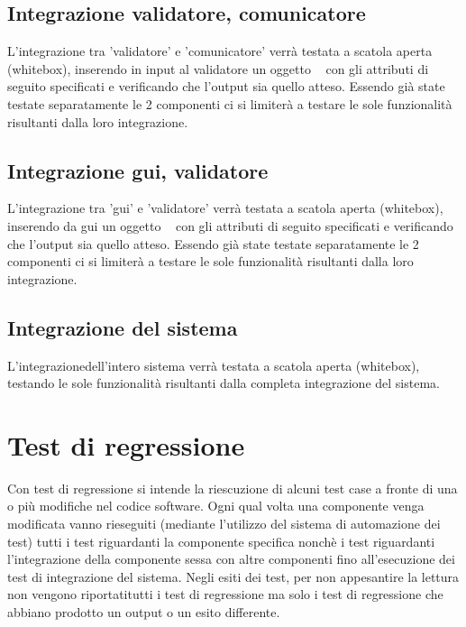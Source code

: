 \subsection{Integrazione validatore, comunicatore}
L'integrazione tra 'validatore' e 'comunicatore' verr\`a testata a scatola aperta (whitebox), inserendo in input al validatore un oggetto \textit{\br\ } con gli attributi di seguito specificati e verificando che l'output sia quello atteso. Essendo gi\`a state testate separatamente le 2 componenti ci si limiter\`a a testare le sole funzionalit\`a risultanti dalla loro integrazione.\\

\subsection{Integrazione gui, validatore}
L'integrazione tra 'gui' e 'validatore' verr\`a testata a scatola aperta (whitebox), inserendo da gui  un oggetto \textit{\br\ } con gli attributi di seguito specificati e verificando che l'output sia quello atteso. Essendo gi\`a state testate separatamente le 2 componenti ci si limiter\`a a testare le sole funzionalit\`a risultanti dalla loro integrazione.\\

\subsection{Integrazione del sistema}
L'integrazionedell'intero sistema verr\`a testata a scatola aperta (whitebox), testando le sole funzionalit\`a risultanti dalla completa integrazione del sistema.\\

\section{Test di regressione}
Con test di regressione si intende la riescuzione di alcuni test case a fronte di una o pi\`u modifiche nel codice software. Ogni qual volta una componente venga modificata vanno rieseguiti (mediante l'utilizzo del sistema di automazione dei test) tutti i test riguardanti la componente specifica nonch\`e i test riguardanti l'integrazione della componente sessa con altre componenti fino all'esecuzione dei test di integrazione del sistema.
Negli esiti dei test, per non appesantire la lettura non vengono riportatitutti i test di regressione ma solo i test di regressione che abbiano prodotto un output o un esito differente.

